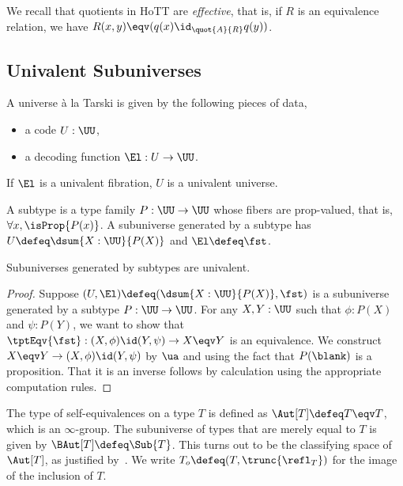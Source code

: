 We recall that quotients in HoTT are \emph{effective}, that is, if $R$ is an equivalence relation, we have
$R(x,y) \eqv (q(x) \id_{\quot{A}{R}} q(y))$.

\subsection{Univalent Subuniverses}


\begin{definition}[Universe]
  A universe \`{a} la Tarski is given by the following pieces of data,
  \begin{itemize}
    \item a code $U : \UU$,
    \item a decoding function $\El : U \to \UU$.
  \end{itemize}
  If $\El$ is a univalent fibration, $U$ is a univalent universe.
\end{definition}

\begin{definition}[Subuniverse]
  A subtype is a type family $P : \UU \to \UU$ whose fibers are prop-valued, that is, $\forall x, \isProp{P(x)}$. A
  subuniverse generated by a subtype has $U \defeq \dsum{X:\UU}{P(X)}$ and $\El \defeq \fst$.
\end{definition}

\begin{proposition}
  Subuniverses generated by subtypes are univalent.
\end{proposition}

\begin{proof}
  Suppose $(U, \El) \defeq (\dsum{X:\UU}{P(X)}, \fst)$ is a subuniverse generated by a subtype $P : \UU \to \UU$. For
  any $X, Y : \UU$ such that $\phi : P(X)$ and $\psi : P(Y)$, we want to show that
  $\tptEqv{\fst} : (X,\phi) \id (Y,\psi) \to X \eqv Y$ is an equivalence. We construct
  $X \eqv Y \to (X,\phi) \id (Y,\psi)$ by $\ua$ and using the fact that $P(\blank)$ is a proposition. That it is an
  inverse follows by calculation using the appropriate computation rules.
\end{proof}

\begin{example}[$\BAut$]
  The type of self-equivalences on a type $T$ is defined as $\Aut[T] \defeq T \eqv T$, which is an $\infty$-group. The
  subuniverse of types that are merely equal to $T$ is given by $\BAut[T] \defeq \Sub{T}$. This turns out to be the
  classifying space of $\Aut[T]$, as justified by~. We write $T_{o} \defeq (T, \trunc{\refl_{T}})$
  for the image of the inclusion of $T$.
\end{example}

